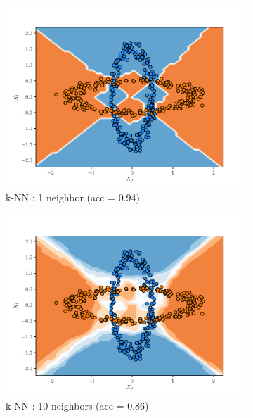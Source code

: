\begin{figure}[H]
    \centering
    \begin{subfigure}{0.495\textwidth}
        \includegraphics[width=\textwidth]{resources/pdf/make_data1_knn_1.pdf}
        \caption{k-NN : 1 neighbor (acc = \num{0.94})}
    \end{subfigure}
    \begin{subfigure}{0.495\textwidth}
        \includegraphics[width=\textwidth]{resources/pdf/make_data1_knn_10.pdf}
        \caption{k-NN : 10 neighbors (acc = \num{0.86})}
    \end{subfigure}
    \vspace{3pt}
    \begin{subfigure}{0.495\textwidth}

\end{subfigure}
\end{figure}
